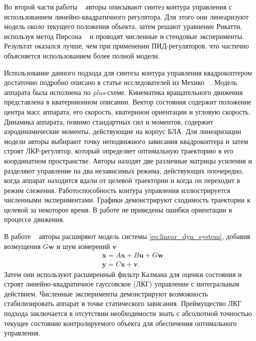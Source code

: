 Во второй части работы ~\cite{Bouabdallah01} авторы описывают синтез контура управления с использованием линейно-квадратичного регулятора. Для этого они линеаризуют модель около текущего положения объекта, затем решают уравнение Рикатти, используя метод Пирсона ~\cite{Longchamp01} и проводят численные и стендовые эксперименты. Результат оказался лучше, чем при применении ПИД-регуляторов, что частично объясняется использованием более полной модели.


Использование данного подхода для синтеза контура управления квадрокоптером достаточно подробно описано в статье исследователей из Мехико ~\cite{Reyes-Valeria01}. Модель аппарата была исполнена по \textit{plus}-схеме. Кинематика вращательного движения представлена в кватернионном описании. Вектор состояния содержит положение центра масс аппарата, его скорость, кватернион ориентации и угловую скорость. Динамика аппарата, помимо стандартных сил и моментов, содержит аэродинамические моменты, действующие на корпус БЛА. Для линеаризации модели авторы выбирают точку неподвижного зависания квадрокоптера и затем строят ЛКР-регулятор, который определяет оптимальную траекторию в его координатном пространстве. Авторы находят две различные матрицы усиления и разделяют управление на два независимых режима, действующих поочередно, когда аппарат находится вдали от целевой траектории и когда он переходит в режим слежения. Работоспособность контура управления иллюстрируется численными экспериментами. Графики демонстрируют сходимость траектории к целевой за некоторое время. В работе не приведены ошибки ориентации в процессе движения.

В работе ~\cite{Minh01} авторы расширяют модель системы \eqref{eq:linear_dyn_system}, добавив возмущения $G \bm{w}$ и шум измерений $\bm{v}$
\begin{equation} \label{eq:linear_dyn_system_noisy}
\begin{aligned}
&\dot{\bm{x}} = A\bm{x} + B\bm{u} + G \bm{w}\\
&\bm{y} = C \bm{x} + \bm{v}.
\end{aligned}
\end{equation}
Затем они используют расширенный фильтр Калмана для оценки состояния и строят линейно-квадратичное гауссовское (ЛКГ) управление с интегральным действием. Численные эксперименты демонстрируют возможность стабилизировать аппарат в точке статического зависания. Преймущество ЛКГ подхода заключается в отсутствии необходимости знать с абсолютной точностью текущее состояние контролируемого объекта для обеспечения оптимального управления.

